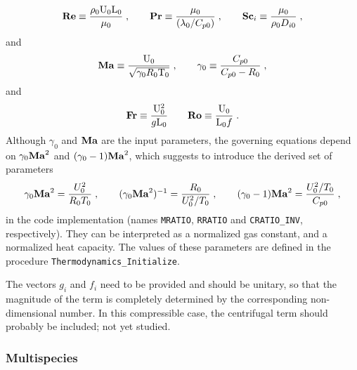 \begin{equation}
    \mathrm{\bf Re} \equiv \frac{\rho_0 \mathrm{U}_0 \mathrm{L}_0}{\mu_0}\;, \qquad
    \mathrm{\bf Pr} \equiv \frac{\mu_0}{(\lambda_0/C_{p0})}\;, \qquad
    \mathrm{\bf Sc}_i \equiv \frac{\mu_0}{\rho_0 D_{i0}}\;,
\end{equation}
and
\begin{equation}
    \mathrm{\bf Ma}  \equiv \frac{\mathrm{U}_0}{\sqrt{\gamma_0 R_0 \mathrm{T}_0}}\;, \qquad
    \gamma_0 \equiv \frac{C_{p0}}{C_{p0}-R_0}\;,
\end{equation}
and
\begin{equation}
    \mathrm{\bf Fr} \equiv \frac{\mathrm{U}_0^2}{g\mathrm{L}_0} \qquad \mathrm{\bf Ro} \equiv \frac{\mathrm{U}_0}{\mathrm{L}_0f} \;.
\end{equation}
Although $\gamma_0$ and $\mathrm{\bf Ma}$ are the input parameters, the governing equations depend on $\gamma_0\mathrm{\bf Ma}^2$ and $(\gamma_0-1)\mathrm{\bf Ma}^2$, which suggests to introduce the derived set of parameters
\begin{equation}
    \gamma_0\mathrm{\bf Ma}^2=\frac{U_0^2}{R_0T_0}\;,\qquad (\gamma_0\mathrm{\bf Ma}^2)^{-1}=\frac{R_0}{U^2_0/T_0}\;,\qquad (\gamma_0-1)\mathrm{\bf Ma}^2 =\frac{U_0^2/T_0}{C_{p0}} \;,
\end{equation}
in the code implementation (names \texttt{MRATIO}, \texttt{RRATIO} and \texttt{CRATIO\_INV}, respectively). They can be interpreted as a normalized gas constant, and a normalized heat capacity. The values of these parameters are defined in the procedure \texttt{Thermodynamics\_Initialize}.

The vectors $g_i$ and $f_i$ need to be provided and should be unitary, so that the magnitude of the term is completely determined by the corresponding non-dimensional number. In this compressible case, the centrifugal term should probably be included; not yet studied.

\subsubsection{Multispecies}


